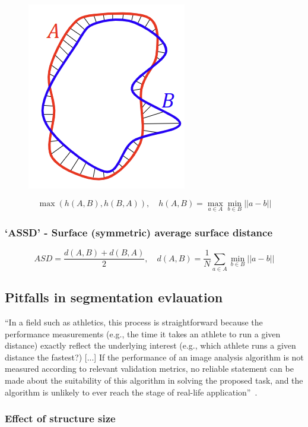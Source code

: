 \documentclass[11pt]{article}
\begin{document}
\begin{figure}[H]
    \centering
    \includegraphics[width=.2\linewidth]{figures/Hausdorff.png}
\end{figure}

\begin{definition}
    \begin{equation*}
        \max(h(A,B),h(B,A)), \quad h(A,B) = \max_{a\in A} \min_{b\in B} ||a-b||
    \end{equation*}
\end{definition}

\subsubsection{`ASSD' - Surface (symmetric) average surface distance}

\begin{definition}
    \begin{equation*}
        ASD = \frac{d(A,B)+d(B,A)}{2}, \quad d(A,B)=\frac 1 N \sum_{a \in A} \min_{b \in B} ||a - b||
    \end{equation*}
\end{definition}

\subsection{Pitfalls in segmentation evlauation}

``In a field such as athletics, this process is straightforward because the performance measurements (e.g., the time it takes an athlete to run a given distance) exactly reflect the underlying interest (e.g., which athlete runs a given distance the fastest?) [...] If the performance of an image analysis algorithm is not measured according to relevant validation metrics, no reliable statement can be made about the suitability of this algorithm in solving the proposed task, and the algorithm is unlikely to ever reach the stage of real-life application''~\cite{pitfalls-in-segmentation-evaluation}. 

\subsubsection{Effect of structure size}
\end{document}
